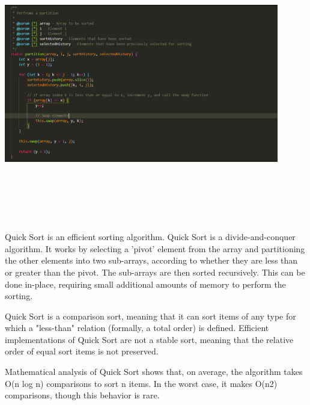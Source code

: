 \begin{center}
    \includegraphics[width=12cm,height=12cm,keepaspectratio]{images/quicksort2}
\end{center}
Quick Sort is an efficient sorting algorithm.
Quick Sort is a divide-and-conquer algorithm. It works by selecting a 'pivot' element from the array and partitioning the other elements into two sub-arrays, according to whether they are less than or greater than the pivot. The sub-arrays are then sorted recursively. This can be done in-place, requiring small additional amounts of memory to perform the sorting.
\par
\bigskip
Quick Sort is a comparison sort, meaning that it can sort items of any type for which a "less-than" relation (formally, a total order) is defined. Efficient implementations of Quick Sort are not a stable sort, meaning that the relative order of equal sort items is not preserved.
\par
\bigskip
Mathematical analysis of Quick Sort shows that, on average, the algorithm takes O(n log n) comparisons to sort n items. In the worst case, it makes O(n2) comparisons, though this behavior is rare.

